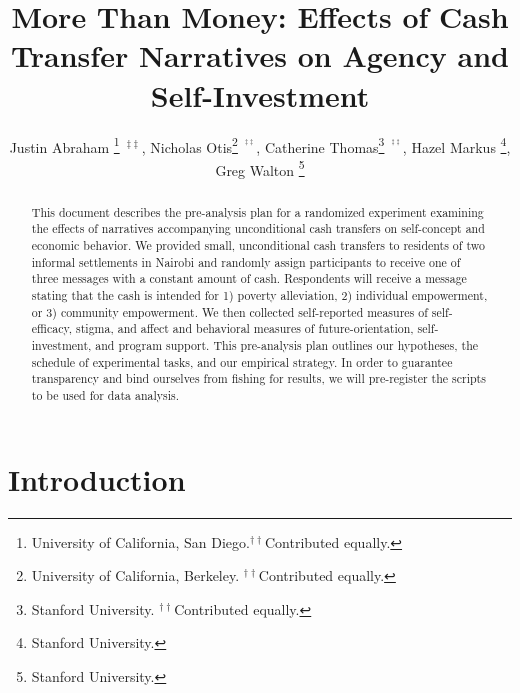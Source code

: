 \documentclass[11pt, a4paper]{article}\usepackage[]{graphicx}\usepackage[]{color}
\begin{document}

\title{More Than Money: Effects of Cash Transfer Narratives on Agency and Self-Investment}
\begin{onehalfspace}

\author{
  Justin Abraham \thanks{University of California, San Diego.$^{\dagger\dagger}$Contributed
equally.}~$^{\ddagger\ddagger}$,
  Nicholas Otis\thanks{University of California, Berkeley. $^{\dagger\dagger}$Contributed
equally.}~$^{^{\ddagger\ddagger}}$,
  Catherine Thomas\thanks{Stanford University. $^{\dagger\dagger}$Contributed equally.}~$^{^{\ddagger\ddagger}}$,
  Hazel Markus \thanks{Stanford University.},
  Greg Walton \thanks{Stanford University.}
        }

\end{onehalfspace}

\maketitle

\begin{abstract}

    This document describes the pre-analysis plan for a randomized experiment examining the effects of narratives accompanying unconditional cash transfers on self-concept and economic behavior. We provided small, unconditional cash transfers to residents of two informal settlements in Nairobi and randomly assign participants to receive one of three messages with a constant amount of cash. Respondents will receive a message stating that the cash is intended for 1) poverty alleviation, 2) individual empowerment, or 3) community empowerment. We then collected self-reported measures of self-efficacy, stigma, and affect and behavioral measures of future-orientation, self-investment, and program support. This pre-analysis plan outlines our hypotheses, the schedule of experimental tasks, and our empirical strategy. In order to guarantee transparency and bind ourselves from fishing for results, we will pre-register the scripts to be used for data analysis.

\end{abstract}

\newpage

\tableofcontents

\newpage

\section{Introduction}
\end{document}
